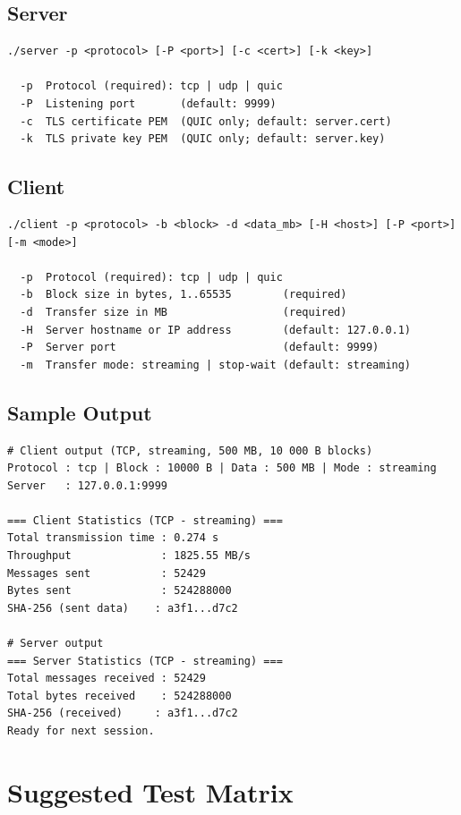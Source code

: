 \documentclass[12pt,a4paper]{article}
\begin{document}
\subsection*{Server}

\begin{lstlisting}
./server -p <protocol> [-P <port>] [-c <cert>] [-k <key>]

  -p  Protocol (required): tcp | udp | quic
  -P  Listening port       (default: 9999)
  -c  TLS certificate PEM  (QUIC only; default: server.cert)
  -k  TLS private key PEM  (QUIC only; default: server.key)
\end{lstlisting}

\subsection*{Client}

\begin{lstlisting}
./client -p <protocol> -b <block> -d <data_mb> [-H <host>] [-P <port>] [-m <mode>]

  -p  Protocol (required): tcp | udp | quic
  -b  Block size in bytes, 1..65535        (required)
  -d  Transfer size in MB                  (required)
  -H  Server hostname or IP address        (default: 127.0.0.1)
  -P  Server port                          (default: 9999)
  -m  Transfer mode: streaming | stop-wait (default: streaming)
\end{lstlisting}

\subsection*{Sample Output}

\begin{lstlisting}
# Client output (TCP, streaming, 500 MB, 10 000 B blocks)
Protocol : tcp | Block : 10000 B | Data : 500 MB | Mode : streaming
Server   : 127.0.0.1:9999

=== Client Statistics (TCP - streaming) ===
Total transmission time : 0.274 s
Throughput              : 1825.55 MB/s
Messages sent           : 52429
Bytes sent              : 524288000
SHA-256 (sent data)    : a3f1...d7c2

# Server output
=== Server Statistics (TCP - streaming) ===
Total messages received : 52429
Total bytes received    : 524288000
SHA-256 (received)     : a3f1...d7c2
Ready for next session.
\end{lstlisting}

\section{Suggested Test Matrix}
\label{app:matrix}
\end{document}
